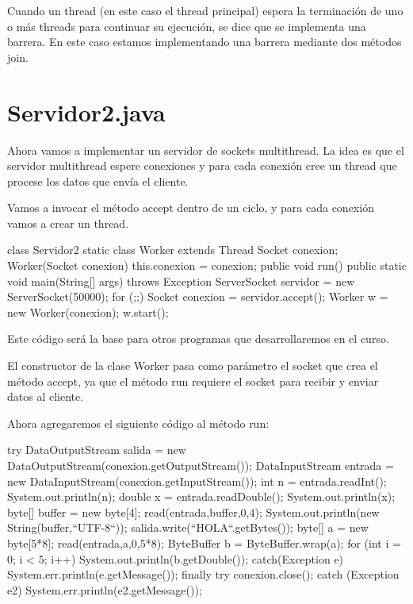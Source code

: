 \documentclass[11pt,a4paper,oneside]{book}
\begin{document}
Cuando un thread (en este caso el thread principal) espera la terminación de uno o más threads para continuar su ejecución, se dice que se implementa una barrera. En este caso estamos implementando una barrera mediante dos métodos join.

\section{Servidor2.java}

Ahora vamos a implementar un servidor de sockets multithread.
La idea es que el servidor multithread espere conexiones y para cada conexión cree un thread que procese los datos que envía el cliente.

Vamos a invocar el método accept dentro de un ciclo, y para cada conexión vamos a crear un thread.

\begin{SourceCode}
class Servidor2
{
  static class Worker extends Thread
  {
    Socket conexion;
    Worker(Socket conexion)
    {
      this.conexion = conexion;
    }
    public void run()
    {
    }
  }
  public static void main(String[] args) throws Exception
  {
    ServerSocket servidor = new ServerSocket(50000);
    for (;;)
    {
      Socket conexion = servidor.accept();
      Worker w = new Worker(conexion);
      w.start();
    }
  }
}
\end{SourceCode}

Este código será la base para otros programas que desarrollaremos en el curso.

El constructor de la clase Worker pasa como parámetro el socket que crea el método accept, ya que el método run requiere el socket para recibir y enviar datos al cliente.

Ahora agregaremos el siguiente código al método run:

\begin{SourceCode}
try
{
  DataOutputStream salida = new DataOutputStream(conexion.getOutputStream());
  DataInputStream entrada = new DataInputStream(conexion.getInputStream());
  int n = entrada.readInt();
  System.out.println(n);
  double x = entrada.readDouble();
  System.out.println(x);
  byte[] buffer = new byte[4];
  read(entrada,buffer,0,4);
  System.out.println(new String(buffer,``UTF-8``));
  salida.write(``HOLA``.getBytes());
  byte[] a = new byte[5*8];
  read(entrada,a,0,5*8);
  ByteBuffer b = ByteBuffer.wrap(a);
  for (int i = 0; i < 5; i++) System.out.println(b.getDouble());
}
catch(Exception e)
{
  System.err.println(e.getMessage());
}
finally
{
  try
  {
    conexion.close();
  }
  catch (Exception e2)
  {
    System.err.println(e2.getMessage());
  }
}
\end{SourceCode}
\end{document}
